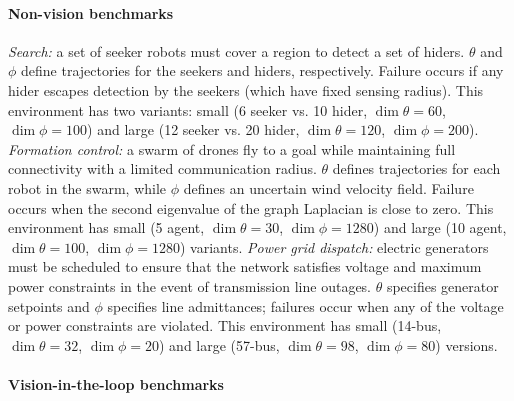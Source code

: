 \paragraph{Non-vision benchmarks}
%
\textit{Search:} a set of seeker robots must cover a region to detect a set of hiders. $\theta$ and $\phi$ define trajectories for the seekers and hiders, respectively. Failure occurs if any hider escapes detection by the seekers (which have fixed sensing radius). This environment has two variants: small (6 seeker vs. 10 hider, $\dim{\theta} = 60$, $\dim{\phi} = 100$) and large (12 seeker vs. 20 hider, $\dim{\theta} = 120$, $\dim{\phi} = 200$).
%
\textit{Formation control:} a swarm of drones fly to a goal while maintaining full connectivity with a limited communication radius. $\theta$ defines trajectories for each robot in the swarm, while $\phi$ defines an uncertain wind velocity field. Failure occurs when the second eigenvalue of the graph Laplacian is close to zero. This environment has small (5 agent, $\dim{\theta} = 30$, $\dim{\phi} = 1280$) and large (10 agent, $\dim{\theta} = 100$, $\dim{\phi} = 1280$) variants.
%
\textit{Power grid dispatch:} electric generators must be scheduled to ensure that the network satisfies voltage and maximum power constraints in the event of transmission line outages. $\theta$ specifies generator setpoints and $\phi$ specifies line admittances; failures occur when any of the voltage or power constraints are violated. This environment has small (14-bus, $\dim{\theta} = 32$, $\dim{\phi} = 20$) and large (57-bus, $\dim{\theta} = 98$, $\dim{\phi} = 80$) versions.

\paragraph{Vision-in-the-loop benchmarks}

